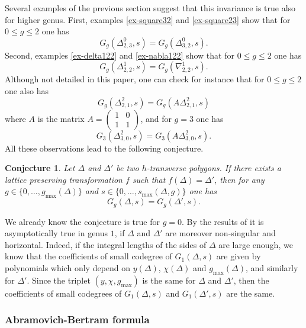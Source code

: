 \documentclass[11pt]{article}
\newtheorem{conj}[theo]{Conjecture}
\theoremstyle{definition}
\numberwithin{equation}{section}
\newcommand{\gmax}{g_{\max}}
\newcommand{\smax}{s_{\max}}
\theoremstyle{plain}
\begin{document}
Several examples of the previous section suggest that this invariance is true also for higher genus. 
First, examples \ref{ex-square32} and \ref{ex-square23} show that for $0\leqslant g \leqslant 2$ one has
\[ G_g(\Delta^0_{2,3},s) = G_g(\Delta^0_{3,2},s) .\]
Second, examples \ref{ex-delta122} and \ref{ex-nabla122} show that for $0\leqslant g \leqslant 2$ one has
\[ G_g(\Delta^1_{2,2},s) = G_g(\nabla^1_{2,2},s) .\]
Although not detailed in this paper, one can check for instance that for $0\leqslant g \leqslant 2$ one also has
\[ G_g(\Delta^2_{2,1},s) = G_g(A\Delta^2_{2,1},s) \]
where $A$ is the matrix $A = \begin{pmatrix} 1 & 0 \\ 1 & 1 \end{pmatrix}$, and for $g=3$ one has
\[ G_3(\Delta^2_{3,0},s) = G_3(A\Delta^2_{3,0},s) . \]
All these observations lead to the following conjecture.

\begin{conj}
    Let $\Delta$ and $\Delta'$ be two $h$-transverse polygons. If there exists a lattice preserving transformation $f$ such that $f(\Delta) = \Delta'$, then for any $g\in \{0,\dots,\gmax(\Delta)\}$ and $s\in\{0,\dots,\smax(\Delta,g)\}$ one has
    \[ G_g(\Delta,s) = G_g(\Delta',s) .\]
\end{conj}

We already know the conjecture is true for $g=0$. 
By the results of \cite{blomme-2025-asymptotic} it is asymptotically true in genus $1$, if $\Delta$ and $\Delta'$ are moreover non-singular and horizontal. Indeed, if the integral lengths of the sides of $\Delta$ are large enough, we know that the coefficients of small codegree of $G_1(\Delta,s)$ are given by polynomials which only depend on $y(\Delta)$, $\chi(\Delta)$ and $\gmax(\Delta)$, and similarly for $\Delta'$. Since the triplet $(y,\chi,\gmax)$ is the same for $\Delta$ and $\Delta'$, then the coefficients of small codegrees of $G_1(\Delta,s)$ and $G_1(\Delta',s)$ are the same.

\subsubsection{Abramovich-Bertram formula}
\end{document}

